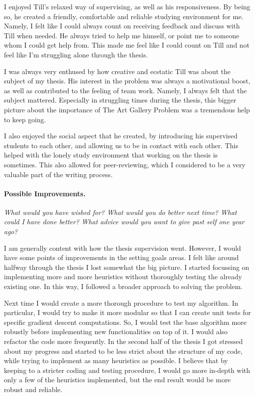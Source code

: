 \documentclass{article}
\begin{document}
I enjoyed Till's relaxed way of supervising, as well as his responsiveness. By being so, he created a friendly, comfortable and reliable studying environment for me. Namely, I felt like I could always count on receiving feedback and discuss with Till when needed. 
He always tried to help me himself, or point me to someone whom I could get help from. This made me feel like I could count on Till and not feel like I'm struggling alone through the thesis.

I was always very enthused by how creative and ecstatic Till was about the subject of my thesis. His interest in the problem was always a motivational boost, as well as contributed to the feeling of team work. Namely, I always felt that the subject mattered. Especially in struggling times during the thesis, this bigger picture about the importance of The Art Gallery Problem was a tremendous help to keep going.

I also enjoyed the social aspect that he created, by introducing his supervised students to each other, and allowing us to be in contact with each other. This helped with the lonely study environment that working on the thesis is sometimes. This also allowed for peer-reviewing, which I considered to be a very valuable part of the writing process.


\paragraph{Possible Improvements.}
\textit{What would you have wished for?
What would you do better next time?
What could I have done better?
What advice would you want to give past self one year ago?}

I am generally content with how the thesis supervision went. However, I would have some points of improvements in the setting goals areas. I felt like around halfway through the thesis I lost somewhat the big picture.
I started focussing on implementing more and more heuristics without thoroughly testing the already existing one. In this way, I followed a broader approach to solving the problem. 

Next time I would create a more thorough procedure to test my algorithm. In particular, I would try to make it more modular so that I can create unit tests for specific gradient descent computations. So, I would test the base algorithm more robustly before implementing new functionalities on top of it. I would also refactor the code more frequently. In the second half of the thesis I got stressed about my progress and started to be less strict about the structure of my code, while trying to implement as many heuristics as possible. I believe that by keeping to a stricter coding and testing procedure, I would go more in-depth with only a few of the heuristics implemented, but the end result would be more robust and reliable.
\end{document}
